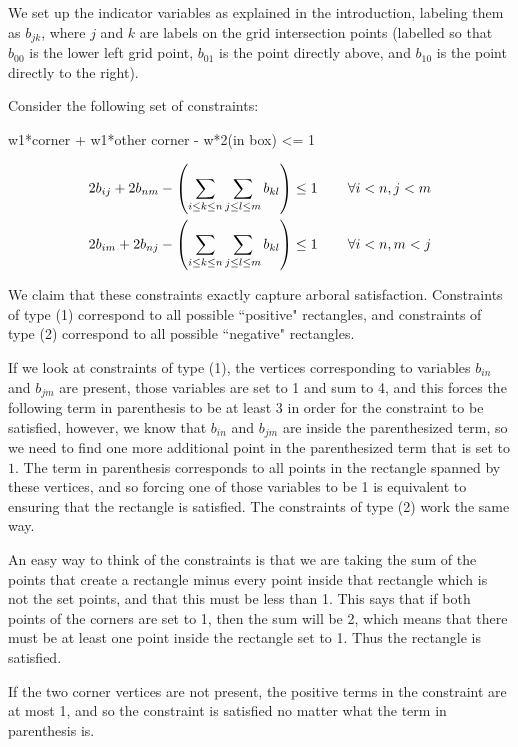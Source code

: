 \documentclass[11pt]{article}
\begin{document}
We set up the indicator variables as explained in the introduction, labeling them as $b_{jk}$, where $j$ and $k$ are labels on the grid intersection points (labelled so that $b_{00}$ is the lower left grid point, $b_{01}$ is the point directly above, and $b_{10}$ is the point directly to the right).

Consider the following set of constraints:

w1*corner + w1*other corner - w*2(in box) <= 1

\begin{align}
2b_{ij} + 2b_{nm} - \left(\sum_{i \leq k \leq n}\sum_{j\leq l \leq m} b_{kl}\right) &\leq 1  \hspace{.3in} \forall i<n, j<m \\
2b_{im} + 2b_{nj} - \left(\sum_{i \leq k \leq n}\sum_{j\leq l \leq m} b_{kl}\right)  &\leq 1  \hspace{.3in} \forall i<n, m<j
\end{align}

We claim that these constraints exactly capture arboral satisfaction. Constraints of type (1) correspond to all possible ``positive" rectangles, and constraints of type (2) correspond to all possible ``negative" rectangles.

If we look at constraints of type (1), the vertices corresponding to variables $b_{in}$ and $b_{jm}$ are present, those variables are set to 1 and sum to 4, and this forces the following term in parenthesis to be at least 3 in order for the constraint to be satisfied, however, we know that $b_{in}$ and $b_{jm}$ are inside the parenthesized term, so we need to find one more additional point in the parenthesized term that is set to $1$. The term in parenthesis corresponds to all points in the rectangle spanned by these vertices, and so forcing one of those variables to be 1 is equivalent to ensuring that the rectangle is satisfied. The constraints of type (2) work the same way.

An easy way to think of the constraints is that we are taking the sum of the points that create a rectangle minus every point inside that rectangle which is not the set points, and that this must be less than 1. This says that if both points of the corners are set to 1, then the sum will be 2, which means that there must be at least one point inside the rectangle set to 1. Thus the rectangle is satisfied. 

If the two corner vertices are not present, the positive terms in the constraint are at most 1, and so the constraint is satisfied no matter what the term in parenthesis is.
\end{document}
